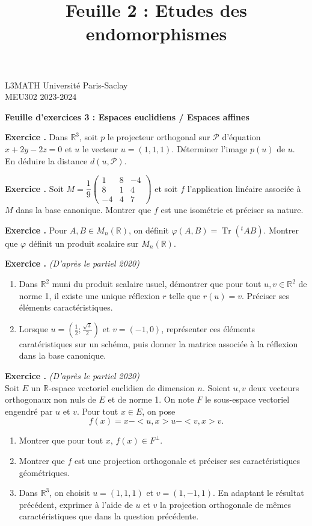 \documentclass[10pt,a4paper]{article}
\title{Feuille 2 : Etudes des endomorphismes}
\def\bf#1{\textbf{#1}}
\newcounter{nexo}
\newcommand{\exo}{\medskip\noindent \bf{ Exercice \thenexo. \stepcounter{nexo}}}
\def\be{\begin{enumerate}}
\def\ee{\end{enumerate}}
\def\ev{espace vectoriel }
\def\sev{sous-espace vectoriel }
\def\R{\mathbb{R}}
\def\mat#1{\begin{pmatrix}#1\end{pmatrix}}
\DeclareMathOperator{\Tr}{Tr}
\begin{document}
\noindent L3MATH \hfill Universit\'e Paris-Saclay \\
MEU302  \hfill  2023-2024\\

\begin{center}
\bf{Feuille d'exercices 3 : Espaces euclidiens / Espaces affines}
\end{center}
\vspace{0.2cm}






\exo
Dans $\R^3$, soit $p$ le projecteur orthogonal sur $\mathcal{P}$ d'équation $x+2y-2z = 0$ et $u$ le vecteur 
$u = (1,1,1)$.
Déterminer l'image $p(u)$ de $u$. En déduire la distance $d(u,\mathcal{P})$.

\exo
Soit $M = \dfrac{1}{9}\mat{
1&8&-4\\
8&1&4\\
-4&4&7}$
et soit $f$ l'application linéaire associée à $M$ dans la base canonique.
Montrer que $f$ est une isométrie et préciser sa nature.

\exo
Pour $A,B \in M_n(\R)$, on définit $\varphi(A,B) = \Tr(^tA B)$.
Montrer que $\varphi$ définit un produit scalaire sur $M_n(\R)$.


\exo \textit{(D'après le partiel 2020)}\\
\be
\item Dans $\R^2$ muni du produit scalaire usuel, 
démontrer que pour tout $u,v\in \R^2$ de norme 1, il existe une unique réflexion $r$ telle que $r(u)=v$. Préciser ses éléments caractéristiques. 
\item  Lorsque $u=(\frac 1 2;\frac {\sqrt 3} 2)$ et $v =(-1,0)$,   représenter ces éléments caratéristiques sur un schéma,  puis donner  la matrice associée à  la réflexion dans la base canonique.
\ee

\exo  \textit{(D'après le partiel 2020)}\\
Soit $E$ un $\R$-\ev euclidien de dimension $n$. 
Soient $u,v$ deux vecteurs orthogonaux non nuls de $E$ et de norme 1. On note $F$ le \sev engendré par $u$ et $v$.
Pour tout $x\in E$, on pose $$f(x)=x-<u,x>u-<v,x>v.$$ \be
\item Montrer que pour tout $x$, $f(x)\in F^\perp$.
\item Montrer que $f$ est une projection orthogonale et préciser ses caractéristiques géométriques. 
\item Dans $\R^3$, on choisit $u=(1,1,1)$ et $v=(1,-1,1)$. En adaptant le résultat précédent, exprimer à l'aide de $u$ et $v$  la projection orthogonale de mêmes caractéristiques que dans la question précédente.
\ee
\end{document}
